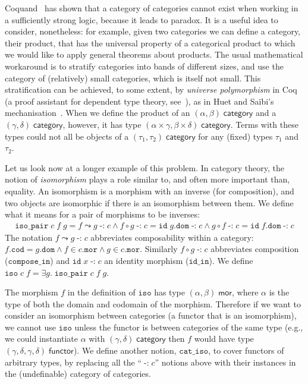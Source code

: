 \documentclass[twoside,titlepage,11pt]{article}
\begin{document}
Coquand~\cite{DBLP:conf/lics/Coquand86} has shown that a category of categories cannot exist when working in a sufficiently strong logic, because it leads to paradox.
It is a useful idea to consider, nonetheless: for example, given two categories we can define a category, their product, that has the universal property of a categorical product to which we would like to apply general theorems about products.
The usual mathematical workaround is to stratify categories into bands of different sizes, and use the category of (relatively) small categories, which is itself not small.
This stratification can be achieved, to some extent, by \emph{universe polymorphism} in Coq (a proof assistant for dependent type theory, see~\cite{DBLP:conf/tphol/Bertot08}), as in Huet and Sa{\"i}bi's mechanisation~\cite{DBLP:conf/birthday/HuetS00}.
When we define the product of an $(\alpha,\beta)\;\mathsf{category}$ and a $(\gamma,\delta)\;\mathsf{category}$, however, it has type $(\alpha\times\gamma,\beta\times\delta)\;\mathsf{category}$.
Terms with these types could not all be objects of a $(\tau_1,\tau_2)\;\mathsf{category}$ for any (fixed) types $\tau_1$ and $\tau_2$.

Let us look now at a longer example of this problem.
In category theory, the notion of \emph{isomorphism} plays a role similar to, and often more important than, equality.
An isomorphism is a morphism with an inverse (for composition), and two objects are isomorphic if there is an isomorphism between them.
We define what it means for a pair of morphisms to be inverses:
\begin{align*}
\mathtt{iso\_pair}\;c\;f\;g=f\leadsto g\operatorname{\mathtt{-:}}c\land f\circ g\operatorname{\mathtt{-:}}c=\mathtt{id}\;g.\mathtt{dom}\operatorname{\mathtt{-:}}c\land g\circ f\operatorname{\mathtt{-:}}c=\mathtt{id}\;f.\mathtt{dom}\operatorname{\mathtt{-:}}c
\end{align*}
The notation $f\leadsto g\operatorname{\mathtt{-:}}c$ abbreviates composability within a category: $f.\mathtt{cod}=g.\mathtt{dom}\land f\in c.\mathtt{mor}\land g\in c.\mathtt{mor}$.
Similarly $f\circ g\operatorname{\mathtt{-:}}c$ abbreviates composition ($\mathtt{compose\_in}$) and $\mathtt{id}\;x\operatorname{-:}c$ an identity morphism ($\mathtt{id\_in}$).
We define $\mathtt{iso}\;c\;f=\exists{g}.\;\mathtt{iso\_pair}\;c\;f\;g$.

The morphism $f$ in the definition of $\mathtt{iso}$ has type $(\alpha,\beta)\;\mathsf{mor}$, where $\alpha$ is the type of both the domain and codomain of the morphism.
Therefore if we want to consider an isomorphism between categories (a functor that is an isomorphism), we cannot use $\mathtt{iso}$ unless the functor is between categories of the same type (e.g., we could instantiate $\alpha$ with $(\gamma,\delta)\;\mathsf{category}$ then $f$ would have type $(\gamma,\delta,\gamma,\delta)\;\mathsf{functor}$).
We define another notion, $\mathtt{cat\_iso}$, to cover functors of arbitrary types, by replacing all the ``$\operatorname{\mathtt{-:}}c$'' notions above with their instances in the (undefinable) category of categories. 
\end{document}
